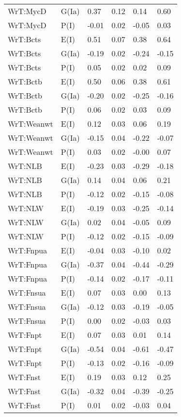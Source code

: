 \begin{center}
\begin{longtable}{|p{1.1in}|p{0.7in}|p{0.7in}|p{0.6in}|p{0.6in}|p{0.6in}|}
  WrT:MycD & G(Ia) & 0.37 & 0.12 & 0.14 & 0.60 \\ 
  WrT:MycD & P(I) & -0.01 & 0.02 & -0.05 & 0.03 \\ 
  WrT:Bcts & E(I) & 0.51 & 0.07 & 0.38 & 0.64 \\ 
  WrT:Bcts & G(Ia) & -0.19 & 0.02 & -0.24 & -0.15 \\ 
  WrT:Bcts & P(I) & 0.05 & 0.02 & 0.02 & 0.09 \\ 
  WrT:Bctb & E(I) & 0.50 & 0.06 & 0.38 & 0.61 \\ 
  WrT:Bctb & G(Ia) & -0.20 & 0.02 & -0.25 & -0.16 \\ 
  WrT:Bctb & P(I) & 0.06 & 0.02 & 0.03 & 0.09 \\ 
  WrT:Weanwt & E(I) & 0.12 & 0.03 & 0.06 & 0.19 \\ 
  WrT:Weanwt & G(Ia) & -0.15 & 0.04 & -0.22 & -0.07 \\ 
  WrT:Weanwt & P(I) & 0.03 & 0.02 & -0.00 & 0.07 \\ 
  WrT:NLB & E(I) & -0.23 & 0.03 & -0.29 & -0.18 \\ 
  WrT:NLB & G(Ia) & 0.14 & 0.04 & 0.06 & 0.21 \\ 
  WrT:NLB & P(I) & -0.12 & 0.02 & -0.15 & -0.08 \\ 
  WrT:NLW & E(I) & -0.19 & 0.03 & -0.25 & -0.14 \\ 
  WrT:NLW & G(Ia) & 0.02 & 0.04 & -0.05 & 0.09 \\ 
  WrT:NLW & P(I) & -0.12 & 0.02 & -0.15 & -0.09 \\ 
  WrT:Fnpua & E(I) & -0.04 & 0.03 & -0.10 & 0.02 \\ 
  WrT:Fnpua & G(Ia) & -0.37 & 0.04 & -0.44 & -0.29 \\ 
  WrT:Fnpua & P(I) & -0.14 & 0.02 & -0.17 & -0.11 \\ 
  WrT:Fnsua & E(I) & 0.07 & 0.03 & 0.00 & 0.13 \\ 
  WrT:Fnsua & G(Ia) & -0.12 & 0.03 & -0.19 & -0.05 \\ 
  WrT:Fnsua & P(I) & 0.00 & 0.02 & -0.03 & 0.03 \\ 
  WrT:Fnpt & E(I) & 0.07 & 0.03 & 0.01 & 0.14 \\ 
  WrT:Fnpt & G(Ia) & -0.54 & 0.04 & -0.61 & -0.47 \\ 
  WrT:Fnpt & P(I) & -0.13 & 0.02 & -0.16 & -0.09 \\ 
  WrT:Fnst & E(I) & 0.19 & 0.03 & 0.12 & 0.25 \\ 
  WrT:Fnst & G(Ia) & -0.32 & 0.04 & -0.39 & -0.25 \\ 
  WrT:Fnst & P(I) & 0.01 & 0.02 & -0.03 & 0.04 \\ 

\end{longtable}
\end{center}
